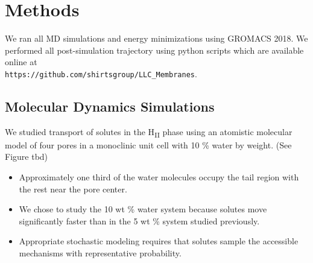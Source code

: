 \documentclass{article}
\begin{document}
  \section{Methods}
    
  We ran all MD simulations and energy minimizations using GROMACS 2018. We  %
  performed all post-simulation trajectory using python scripts which are available
  online at \\ \texttt{https://github.com/shirtsgroup/LLC\_Membranes}.

  \subsection{Molecular Dynamics Simulations}

  We studied transport of solutes in the H\textsubscript{II} phase using an
  atomistic molecular model of four pores in a monoclinic unit cell with 
  10 \% water by weight. (See Figure tbd)
  \begin{itemize}
    \item Approximately one third of the water molecules occupy the tail region 
    with the rest near the pore center.
    \item We chose to study the 10 wt \% water system because solutes move 
    significantly faster than in the 5 wt \% system studied previously.
    \item Appropriate stochastic modeling requires that solutes sample the 
    accessible mechanisms with representative probability.  %
  \end{itemize}
  
\end{document}
